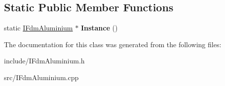 \subsection*{Static Public Member Functions}
\begin{DoxyCompactItemize}
\item 
\hypertarget{class_f_d_m_1_1_i_fdm_aluminium_abe1f9b39594a50120c936b5e4d15061e}{}static \hyperlink{class_f_d_m_1_1_i_fdm_aluminium}{I\+Fdm\+Aluminium} $\ast$ {\bfseries Instance} ()\label{class_f_d_m_1_1_i_fdm_aluminium_abe1f9b39594a50120c936b5e4d15061e}

\end{DoxyCompactItemize}


The documentation for this class was generated from the following files\+:\begin{DoxyCompactItemize}
\item 
include/I\+Fdm\+Aluminium.\+h\item 
src/I\+Fdm\+Aluminium.\+cpp\end{DoxyCompactItemize}

